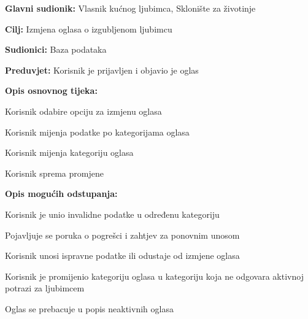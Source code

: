 					\noindent {}
					\begin{packed_item}
						
						\item \textbf{Glavni sudionik: }Vlasnik kućnog ljubimca, Sklonište za životinje
						\item  \textbf{Cilj:} Izmjena oglasa o izgubljenom ljubimcu
						\item  \textbf{Sudionici:} Baza podataka
						\item  \textbf{Preduvjet:} Korisnik je prijavljen i objavio je oglas
						\item  \textbf{Opis osnovnog tijeka:}
						
						\item[] \begin{packed_enum}
							
							\item Korisnik odabire opciju za izmjenu oglasa
							\item 
								\begin{packed_item}
									\item[a$)$] Korisnik mijenja podatke po kategorijama oglasa
									\item[b$)$] Korisnik mijenja kategoriju oglasa 
								\end{packed_item}
							\item Korisnik sprema promjene
						\end{packed_enum}
						
						\item  \textbf{Opis mogućih odstupanja:}
						
						\item[] \begin{packed_item}
							
							\item[2.a] Korisnik je unio invalidne podatke u određenu kategoriju
							\item[] \begin{packed_enum}
								
								\item  Pojavljuje se poruka o pogrešci i zahtjev za ponovnim unosom
								\item Korisnik unosi ispravne podatke ili odustaje od izmjene oglasa
								
							\end{packed_enum}
							\item[2.b] Korisnik je promijenio kategoriju oglasa u kategoriju koja ne odgovara aktivnoj potrazi za ljubimcem
							\begin{packed_enum}
								
								\item Oglas se prebacuje u popis neaktivnih oglasa
								
							\end{packed_enum}
							
						\end{packed_item}
					\end{packed_item}
